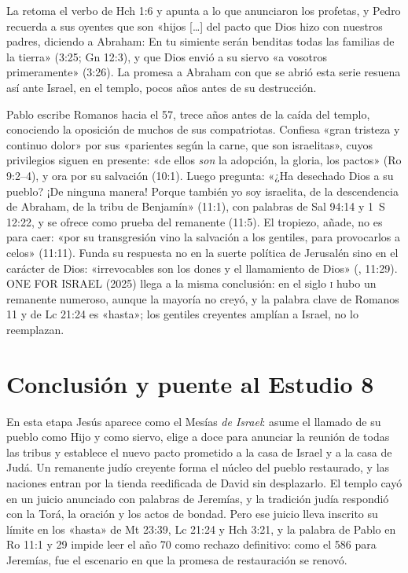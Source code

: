 La  retoma el verbo de Hch 1:6 y apunta a lo que anunciaron los profetas, y Pedro recuerda a sus oyentes que son «hijos [\ldots] del pacto que Dios hizo con nuestros padres, diciendo a Abraham: En tu simiente serán benditas todas las familias de la tierra» (3:25; Gn 12:3), y que Dios envió a su siervo «a vosotros primeramente» (3:26). La promesa a Abraham con que se abrió esta serie resuena así ante Israel, en el templo, pocos años antes de su destrucción.

Pablo escribe Romanos hacia el 57, trece años antes de la caída del templo, conociendo la oposición de muchos de sus compatriotas. Confiesa «gran tristeza y continuo dolor» por sus «parientes según la carne, que son israelitas», cuyos privilegios siguen en presente: «de ellos \emph{son} la adopción, la gloria, los pactos» (Ro 9:2--4), y ora por su salvación (10:1). Luego pregunta: «¿Ha desechado Dios a su pueblo? ¡De ninguna manera! Porque también yo soy israelita, de la descendencia de Abraham, de la tribu de Benjamín» (11:1), con palabras de Sal 94:14 y 1~S 12:22, y se ofrece como prueba del remanente (11:5). El tropiezo, añade, no es para caer: «por su transgresión vino la salvación a los gentiles, para provocarlos a celos» (11:11). Funda su respuesta no en la suerte política de Jerusalén sino en el carácter de Dios: «irrevocables son los dones y el llamamiento de Dios» (, 11:29). ONE FOR ISRAEL (2025) llega a la misma conclusión: en el siglo \textsc{i} hubo un remanente numeroso, aunque la mayoría no creyó, y la palabra clave de Romanos 11 y de Lc 21:24 es «hasta»; los gentiles creyentes amplían a Israel, no lo reemplazan.

\section{Conclusión y puente al Estudio 8}

En esta etapa Jesús aparece como el Mesías \emph{de Israel}: asume el llamado de su pueblo como Hijo y como siervo, elige a doce para anunciar la reunión de todas las tribus y establece el nuevo pacto prometido a la casa de Israel y a la casa de Judá. Un remanente judío creyente forma el núcleo del pueblo restaurado, y las naciones entran por la tienda reedificada de David sin desplazarlo. El templo cayó en un juicio anunciado con palabras de Jeremías, y la tradición judía respondió con la Torá, la oración y los actos de bondad. Pero ese juicio lleva inscrito su límite en los «hasta» de Mt 23:39, Lc 21:24 y Hch 3:21, y la palabra de Pablo en Ro 11:1 y 29 impide leer el año 70 como rechazo definitivo: como el 586 para Jeremías, fue el escenario en que la promesa de restauración se renovó.

